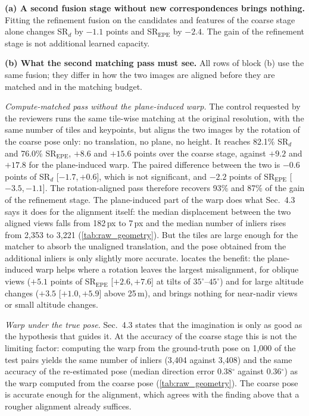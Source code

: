 \documentclass[10pt,twocolumn,letterpaper]{article}
\newcommand{\SRd}{SR$_{d}$}
\newcommand{\SRe}{SR$_{\mathrm{EPE}}$}
\newcommand{\ci}[2]{{\scriptsize[\ensuremath{#1},\,\ensuremath{#2}]}}
\begin{document}
\noindent\textbf{(a) A second fusion stage without new correspondences brings nothing.} Fitting the refinement fusion on the candidates and features of the coarse stage alone changes \SRd{} by \ensuremath{-1.1}{} points and \SRe{} by \ensuremath{-2.4}{}. The gain of the refinement stage is not additional learned capacity.

\noindent\textbf{(b) What the second matching pass must see.} All rows of block (b) use the same fusion; they differ in how the two images are aligned before they are matched and in the matching budget.

\emph{Compute-matched pass without the plane-induced warp.} The control requested by the reviewers runs the same tile-wise matching at the original resolution, with the same number of tiles and keypoints, but aligns the two images by the rotation of the coarse pose only: no translation, no plane, no height. It reaches 82.1\% \SRd{} and 76.0\% \SRe, \ie \ensuremath{+8.6}{} and \ensuremath{+15.6}{} points over the coarse stage, against \ensuremath{+9.2}{} and \ensuremath{+17.8}{} for the plane-induced warp. The paired difference between the two is \ensuremath{-0.6}{} points of \SRd{} \ci{\ensuremath{-1.7}}{\ensuremath{+0.6}}, which is not significant, and \ensuremath{-2.2}{} points of \SRe{} \ci{\ensuremath{-3.5}}{\ensuremath{-1.1}}. The rotation-aligned pass therefore recovers 93\% and 87\% of the gain of the refinement stage. The plane-induced part of the warp does what Sec.~4.3 says it does for the alignment itself: the median displacement between the two aligned views falls from 182\,px to 7\,px and the median number of inliers rises from 2{,}353 to 3{,}221 (\cref{tab:raw_geometry}). But the tiles are large enough for the matcher to absorb the unaligned translation, and the pose obtained from the additional inliers is only slightly more accurate.  locates the benefit: the plane-induced warp helps where a rotation leaves the largest misalignment, for oblique views (\ensuremath{+5.1}{} points of \SRe{} \ci{\ensuremath{+2.6}}{\ensuremath{+7.6}} at tilts of $35^\circ$--$45^\circ$) and for large altitude changes (\ensuremath{+3.5}{} \ci{\ensuremath{+1.0}}{\ensuremath{+5.9}} above 25\,m), and brings nothing for near-nadir views or small altitude changes.

\emph{Warp under the true pose.} Sec.~4.3 states that the imagination is only as good as the hypothesis that guides it. At the accuracy of the coarse stage this is not the limiting factor: computing the warp from the ground-truth pose on 1{,}000 of the test pairs yields the same number of inliers (3{,}404 against 3{,}408) and the same accuracy of the re-estimated pose (median direction error 0.38$^\circ$ against 0.36$^\circ$) as the warp computed from the coarse pose (\cref{tab:raw_geometry}). The coarse pose is accurate enough for the alignment, which agrees with the finding above that a rougher alignment already suffices.
\end{document}
